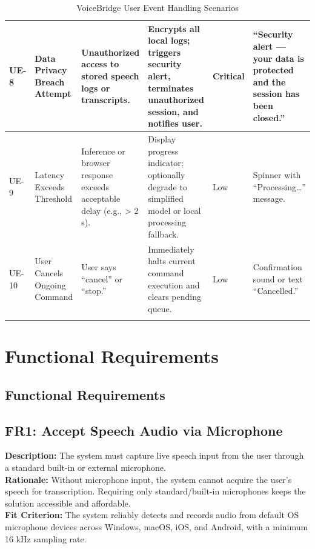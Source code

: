 \documentclass[11pt]{article}
\begin{document}
\begin{table}[H]
\begin{tabularx}{\textwidth}{p{1cm} p{2cm} X X p{1cm} p{2cm}}
\hline
UE-8 & Data Privacy Breach Attempt & Unauthorized access to stored speech logs or transcripts. & Encrypts all local logs; triggers security alert, terminates unauthorized session, and notifies user. & Critical & “Security alert — your data is protected and the session has been closed.” \\
\hline
UE-9 & Latency Exceeds Threshold & Inference or browser response exceeds acceptable delay (e.g., > 2 s). & Display progress indicator; optionally degrade to simplified model or local processing fallback. & Low & Spinner with “Processing…” message. \\
\hline
UE-10 & User Cancels Ongoing Command & User says “cancel” or “stop.” & Immediately halts current command execution and clears pending queue. & Low & Confirmation sound or text “Cancelled.” \\
\bottomrule
\caption{VoiceBridge User Event Handling Scenarios}
\end{tabularx}
\end{table}



\section{Functional Requirements}
\subsection{Functional Requirements}

\subsection{FR1: Accept Speech Audio via Microphone}
\textbf{Description:} The system must capture live speech input from the user through a standard built-in or external microphone.\\
\textbf{Rationale:} Without microphone input, the system cannot acquire the user’s speech for transcription. Requiring only standard/built-in microphones keeps the solution accessible and affordable.\\
\textbf{Fit Criterion:} The system reliably detects and records audio from default OS microphone devices across Windows, macOS, iOS, and Android, with a minimum 16 kHz sampling rate.

\bigskip
\end{document}
